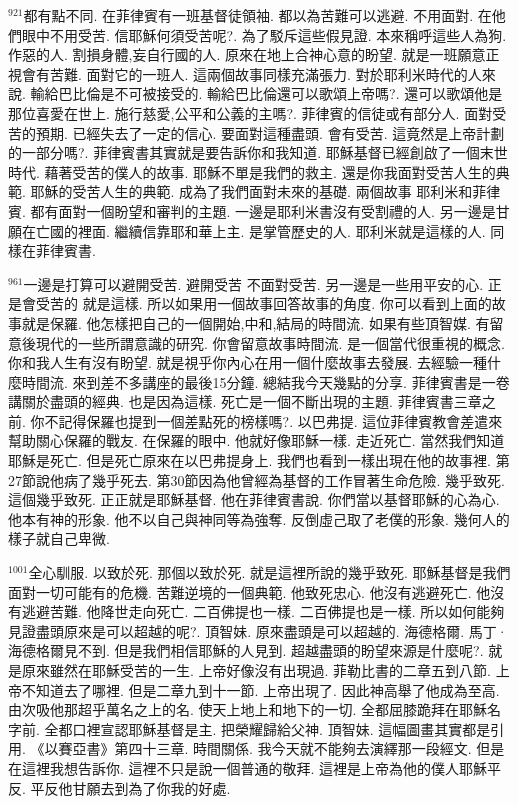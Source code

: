 \documentclass{book}
\begin{document}
$^{921}$都有點不同.
在菲律賓有一班基督徒領袖.
都以為苦難可以逃避.
不用面對.
在他們眼中不用受苦.
信耶穌何須受苦呢?.
為了駁斥這些假見證.
本來稱呼這些人為狗.
作惡的人.
割損身體,妄自行國的人.
原來在地上合神心意的盼望.
就是一班願意正視會有苦難.
面對它的一班人.
這兩個故事同樣充滿張力.
對於耶利米時代的人來說.
輸給巴比倫是不可被接受的.
輸給巴比倫還可以歌頌上帝嗎?.
還可以歌頌他是那位喜愛在世上.
施行慈愛,公平和公義的主嗎?.
菲律賓的信徒或有部分人.
面對受苦的預期.
已經失去了一定的信心.
要面對這種盡頭.
會有受苦.
這竟然是上帝計劃的一部分嗎?.
菲律賓書其實就是要告訴你和我知道.
耶穌基督已經創啟了一個末世時代.
藉著受苦的僕人的故事.
耶穌不單是我們的救主.
還是你我面對受苦人生的典範.
耶穌的受苦人生的典範.
成為了我們面對未來的基礎.
兩個故事 耶利米和菲律賓.
都有面對一個盼望和審判的主題.
一邊是耶利米書沒有受割禮的人.
另一邊是甘願在亡國的裡面.
繼續信靠耶和華上主.
是掌管歷史的人.
耶利米就是這樣的人.
同樣在菲律賓書.

$^{961}$一邊是打算可以避開受苦.
避開受苦 不面對受苦.
另一邊是一些用平安的心.
正是會受苦的 就是這樣.
所以如果用一個故事回答故事的角度.
你可以看到上面的故事就是保羅.
他怎樣把自己的一個開始,中和,結局的時間流.
如果有些頂智媒.
有留意後現代的一些所謂意識的研究.
你會留意故事時間流.
是一個當代很重視的概念.
你和我人生有沒有盼望.
就是視乎你內心在用一個什麼故事去發展.
去經驗一種什麼時間流.
來到差不多講座的最後15分鐘.
總結我今天幾點的分享.
菲律賓書是一卷講關於盡頭的經典.
也是因為這樣.
死亡是一個不斷出現的主題.
菲律賓書三章之前.
你不記得保羅也提到一個差點死的榜樣嗎?.
以巴弗提.
這位菲律賓教會差遣來幫助關心保羅的戰友.
在保羅的眼中.
他就好像耶穌一樣.
走近死亡.
當然我們知道耶穌是死亡.
但是死亡原來在以巴弗提身上.
我們也看到一樣出現在他的故事裡.
第27節說他病了幾乎死去.
第30節因為他曾經為基督的工作冒著生命危險.
幾乎致死.
這個幾乎致死.
正正就是耶穌基督.
他在菲律賓書說.
你們當以基督耶穌的心為心.
他本有神的形象.
他不以自己與神同等為強奪.
反倒虛己取了老僕的形象.
幾何人的樣子就自己卑微.

$^{1001}$全心馴服.
以致於死.
那個以致於死.
就是這裡所說的幾乎致死.
耶穌基督是我們面對一切可能有的危機.
苦難逆境的一個典範.
他致死忠心.
他沒有逃避死亡.
他沒有逃避苦難.
他降世走向死亡.
二百佛提也一樣.
二百佛提也是一樣.
所以如何能夠見證盡頭原來是可以超越的呢?.
頂智妹.
原來盡頭是可以超越的.
海德格爾.
馬丁·海德格爾見不到.
但是我們相信耶穌的人見到.
超越盡頭的盼望來源是什麼呢?.
就是原來雖然在耶穌受苦的一生.
上帝好像沒有出現過.
菲勒比書的二章五到八節.
上帝不知道去了哪裡.
但是二章九到十一節.
上帝出現了.
因此神高舉了他成為至高.
由次吸他那超乎萬名之上的名.
使天上地上和地下的一切.
全都屈膝跪拜在耶穌名字前.
全都口裡宣認耶穌基督是主.
把榮耀歸給父神.
頂智妹.
這幅圖畫其實都是引用.
《以賽亞書》第四十三章.
時間關係.
我今天就不能夠去演繹那一段經文.
但是在這裡我想告訴你.
這裡不只是說一個普通的敬拜.
這裡是上帝為他的僕人耶穌平反.
平反他甘願去到為了你我的好處.
\end{document}
